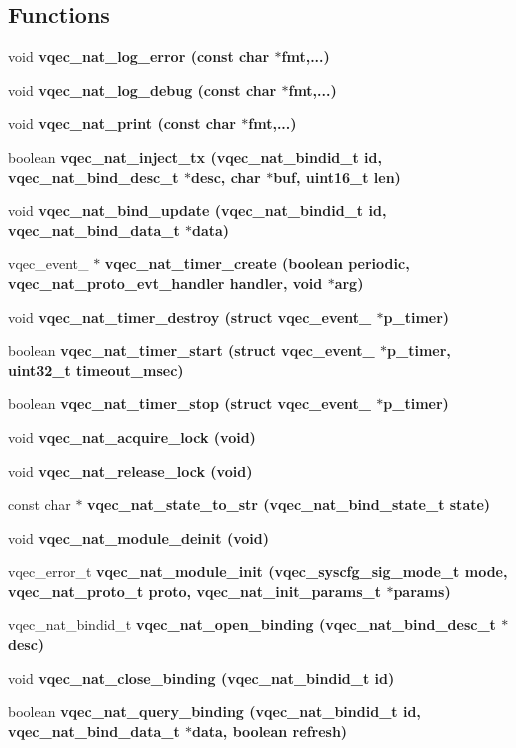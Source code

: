 \subsection*{Functions}
\begin{CompactItemize}
\item 
void \bf{vqec\_\-nat\_\-log\_\-error} (const char $\ast$fmt,...)
\item 
void \bf{vqec\_\-nat\_\-log\_\-debug} (const char $\ast$fmt,...)
\item 
void \bf{vqec\_\-nat\_\-print} (const char $\ast$fmt,...)
\item 
boolean \bf{vqec\_\-nat\_\-inject\_\-tx} (vqec\_\-nat\_\-bindid\_\-t id, vqec\_\-nat\_\-bind\_\-desc\_\-t $\ast$desc, char $\ast$buf, uint16\_\-t len)
\item 
void \bf{vqec\_\-nat\_\-bind\_\-update} (vqec\_\-nat\_\-bindid\_\-t id, vqec\_\-nat\_\-bind\_\-data\_\-t $\ast$data)
\item 
vqec\_\-event\_\- $\ast$ \bf{vqec\_\-nat\_\-timer\_\-create} (boolean periodic, vqec\_\-nat\_\-proto\_\-evt\_\-handler handler, void $\ast$arg)
\item 
void \bf{vqec\_\-nat\_\-timer\_\-destroy} (struct vqec\_\-event\_\- $\ast$p\_\-timer)
\item 
boolean \bf{vqec\_\-nat\_\-timer\_\-start} (struct vqec\_\-event\_\- $\ast$p\_\-timer, uint32\_\-t timeout\_\-msec)
\item 
boolean \bf{vqec\_\-nat\_\-timer\_\-stop} (struct vqec\_\-event\_\- $\ast$p\_\-timer)
\item 
void \bf{vqec\_\-nat\_\-acquire\_\-lock} (void)
\item 
void \bf{vqec\_\-nat\_\-release\_\-lock} (void)
\item 
const char $\ast$ \bf{vqec\_\-nat\_\-state\_\-to\_\-str} (vqec\_\-nat\_\-bind\_\-state\_\-t state)
\item 
void \bf{vqec\_\-nat\_\-module\_\-deinit} (void)
\item 
vqec\_\-error\_\-t \bf{vqec\_\-nat\_\-module\_\-init} (\bf{vqec\_\-syscfg\_\-sig\_\-mode\_\-t} mode, vqec\_\-nat\_\-proto\_\-t proto, vqec\_\-nat\_\-init\_\-params\_\-t $\ast$params)
\item 
vqec\_\-nat\_\-bindid\_\-t \bf{vqec\_\-nat\_\-open\_\-binding} (vqec\_\-nat\_\-bind\_\-desc\_\-t $\ast$desc)
\item 
void \bf{vqec\_\-nat\_\-close\_\-binding} (vqec\_\-nat\_\-bindid\_\-t id)
\item 
boolean \bf{vqec\_\-nat\_\-query\_\-binding} (vqec\_\-nat\_\-bindid\_\-t id, vqec\_\-nat\_\-bind\_\-data\_\-t $\ast$data, boolean refresh)

\end{CompactItemize}
